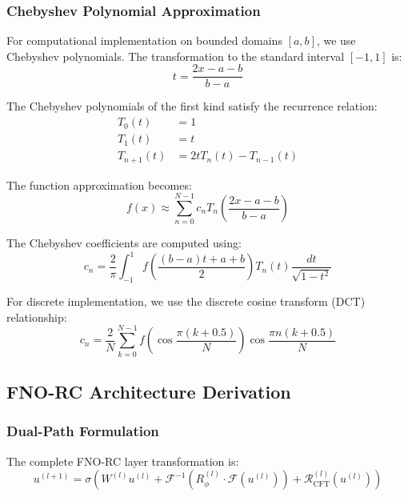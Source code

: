 \documentclass[11pt,twocolumn]{article}
\begin{document}
\subsubsection{Chebyshev Polynomial Approximation}

For computational implementation on bounded domains $[a,b]$, we use Chebyshev polynomials. The transformation to the standard interval $[-1,1]$ is:
\begin{equation}
t = \frac{2x - a - b}{b - a}
\end{equation}

The Chebyshev polynomials of the first kind satisfy the recurrence relation:
\begin{align}
T_0(t) &= 1 \\
T_1(t) &= t \\
T_{n+1}(t) &= 2t T_n(t) - T_{n-1}(t)
\end{align}

The function approximation becomes:
\begin{equation}
f(x) \approx \sum_{n=0}^{N-1} c_n T_n\left(\frac{2x - a - b}{b - a}\right)
\end{equation}

The Chebyshev coefficients are computed using:
\begin{equation}
c_n = \frac{2}{\pi} \int_{-1}^{1} f\left(\frac{(b-a)t + a + b}{2}\right) T_n(t) \frac{dt}{\sqrt{1-t^2}}
\end{equation}

For discrete implementation, we use the discrete cosine transform (DCT) relationship:
\begin{equation}
c_n = \frac{2}{N} \sum_{k=0}^{N-1} f\left(\cos\frac{\pi(k+0.5)}{N}\right) \cos\frac{\pi n(k+0.5)}{N}
\end{equation}

\subsection{FNO-RC Architecture Derivation}
\label{app:fnore_derivation}

\subsubsection{Dual-Path Formulation}

The complete FNO-RC layer transformation is:
\begin{equation}
u^{(l+1)} = \sigma\left( W^{(l)} u^{(l)} + \mathcal{F}^{-1}\left( R_\phi^{(l)} \cdot \mathcal{F}(u^{(l)}) \right) + \mathcal{R}_{\text{CFT}}^{(l)}(u^{(l)}) \right)
\end{equation}
\end{document}
